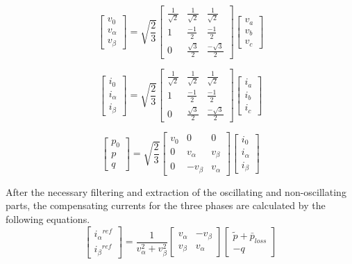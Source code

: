 \documentclass[journal,twoside]{IEEEtran}
\begin{document}
\[ \begin{bmatrix} v_0 \\ v_{\alpha} \\v_{\beta} \end{bmatrix}
=\sqrt{\frac{2}{3}} \begin{bmatrix} \frac{1}{\sqrt 2} & \frac{1}{\sqrt 2} &\frac{1}{\sqrt 2}\\ 1 & \frac{-1}{2} & \frac{-1}{2}\\ 0 & \frac{\sqrt 3}{2} & \frac{-\sqrt 3}{2} \end{bmatrix} \begin{bmatrix} v_a \\ v_b \\ v_c \end{bmatrix} \] 


\[ \begin{bmatrix} i_0 \\ i_{\alpha} \\i_{\beta} \end{bmatrix}
=\sqrt{\frac{2}{3}} \begin{bmatrix} \frac{1}{\sqrt 2} & \frac{1}{\sqrt 2} &\frac{1}{\sqrt 2}\\ 1 & \frac{-1}{2} & \frac{-1}{2}\\ 0 & \frac{\sqrt 3}{2} & \frac{-\sqrt 3}{2} \end{bmatrix} \begin{bmatrix} i_a \\ i_b \\ i_c \end{bmatrix} \] 


\[ \begin{bmatrix} p_0 \\ p \\q \end{bmatrix}
=\sqrt{\frac{2}{3}} \begin{bmatrix} v_0 & 0 &0\\ 0 & v_{\alpha} & v_{\beta}\\ 0 & -v_{\beta} & v_{\alpha} \end{bmatrix} \begin{bmatrix} i_0 \\ i_{\alpha} \\ i_{\beta} \end{bmatrix} \] 



After the necessary filtering and extraction of the oscillating
and non-oscillating parts, the compensating currents for the
three phases are calculated by the following equations.
\[\begin{bmatrix} {i_{\alpha}}^{ref}\\{i_{\beta}}^{ref} \end{bmatrix} = \frac{1}{v_{\alpha}^2+v_{\beta}^2} \begin{bmatrix} v_{\alpha} & -v_{\beta}\\v_{\beta} & v_{\alpha} \end{bmatrix} \begin{bmatrix} \tilde{p} +{\bar{p}_{loss}} \\ -q \end{bmatrix}
\]
\end{document}
